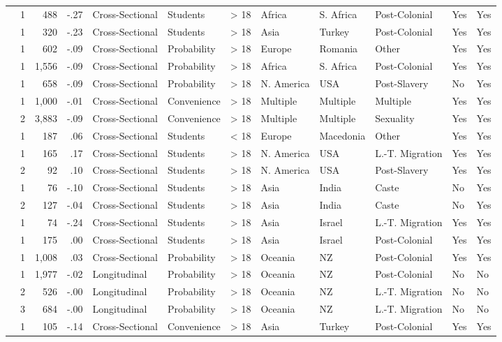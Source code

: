 \documentclass[10pt, letterpaper]{article}
\begin{document}
\begin{landscape}
\begin{xltabular}{650pt}{Xrrrllrlllll}
\cite{284} & 1 & 488 & -.27 & Cross-Sectional & Students & > 18 & Africa & S. Africa & Post-Colonial & Yes & Yes\\
\cite{1614} & 1 & 320 & -.23 & Cross-Sectional & Students & > 18 & Asia & Turkey & Post-Colonial & Yes & Yes\\
\cite{3205} & 1 & 602 & -.09 & Cross-Sectional & Probability & > 18 & Europe & Romania & Other & Yes & Yes\\
\cite{1386} & 1 & 1,556 & -.09 & Cross-Sectional & Probability & > 18 & Africa & S. Africa & Post-Colonial & Yes & Yes\\
\cite{1549} & 1 & 658 & -.09 & Cross-Sectional & Probability & > 18 & N. America & USA & Post-Slavery & No & Yes\\
\cite{3054} & 1 & 1,000 & -.01 & Cross-Sectional & Convenience & > 18 & Multiple & Multiple & Multiple & Yes & Yes\\
 & 2 & 3,883 & -.09 & Cross-Sectional & Convenience & > 18 & Multiple & Multiple & Sexuality & Yes & Yes\\
\cite{856} & 1 & 187 & .06 & Cross-Sectional & Students & < 18 & Europe & Macedonia & Other & Yes & Yes\\
\cite{1042} & 1 & 165 & .17 & Cross-Sectional & Students & > 18 & N. America & USA & L.-T. Migration & Yes & Yes\\
 & 2 & 92 & .10 & Cross-Sectional & Students & > 18 & N. America & USA & Post-Slavery & Yes & Yes\\
\cite{2380} & 1 & 76 & -.10 & Cross-Sectional & Students & > 18 & Asia & India & Caste & No & Yes\\
 & 2 & 127 & -.04 & Cross-Sectional & Students & > 18 & Asia & India & Caste & No & Yes\\
\cite{4005} & 1 & 74 & -.24 & Cross-Sectional & Students & > 18 & Asia & Israel & L.-T. Migration & Yes & Yes\\
\cite{813} & 1 & 175 & .00 & Cross-Sectional & Students & > 18 & Asia & Israel & Post-Colonial & Yes & Yes\\
\cite{1695} & 1 & 1,008 & .03 & Cross-Sectional & Probability & > 18 & Oceania & NZ & Post-Colonial & Yes & Yes\\
\cite{2381} & 1 & 1,977 & -.02 & Longitudinal & Probability & > 18 & Oceania & NZ & Post-Colonial & No & No\\
 & 2 & 526 & -.00 & Longitudinal & Probability & > 18 & Oceania & NZ & L.-T. Migration & No & No\\
 & 3 & 684 & -.00 & Longitudinal & Probability & > 18 & Oceania & NZ & L.-T. Migration & No & No\\
\cite{286} & 1 & 105 & -.14 & Cross-Sectional & Convenience & > 18 & Asia & Turkey & Post-Colonial & Yes & Yes\\
 
\end{xltabular}
 
\end{landscape}

\printbibliography
\end{document}
